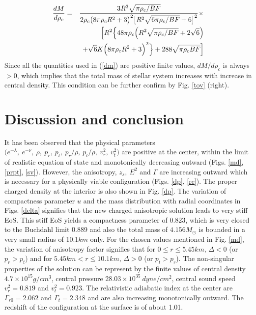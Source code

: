 \documentclass[preprintnumbers,amsmath,amssymb,floatfix,9pt,prd,twocolumn,
superscriptaddress,nofootinbib]{revtex4}
\begin{document}
\begin{eqnarray}
{d M \over d \rho_c} &=& \frac{3 R^3 \sqrt{\pi  \rho_c /B F} }{2 \rho_c \big(8 \pi  \rho_c R^2+3\big)^2 \big[R^2 \sqrt{6 \pi  \rho_c/B F}+6\big]^2}\times \nonumber\\
&&\Big[R^2 \Big\{48 \pi  \rho_c \Big(R^2 \sqrt{\pi \rho_c/B F}+2 \sqrt{6}\Big)\nonumber\\
&&+\sqrt{6} K \Big(8 \pi  \rho_c R^2+3\Big)^2\Big\}+288 \sqrt{\pi  \rho_c B F}\Big] \label{dm}
\end{eqnarray}
Since all the quantities used in (\ref{dm}) are positive finite values, $dM/d\rho_c$ is always $>0$, which implies that the total mass of stellar system increases with increase in central density. This condition can be further confirm by Fig. \ref{tov} (right).



\section{Discussion and conclusion}

It has been observed that the physical parameters $\big(e^{-\lambda},~e^{-\nu},~\rho,~p_r,~p_t,~p_r/\rho,~p_t/\rho,~v_r^2,~v_t^2 \big)$ are positive at the center, within the limit of realistic equation of state and monotonically decreasing outward (Figs. \ref{md}, \ref{prpt}, \ref{sv}). However, the anisotropy, $z_s,~E^2$ and $\Gamma$ are increasing outward which is necessary for a physically viable configuration (Figs. \ref{dp}, \ref{re}). The proper charged density at the interior is also shown in Fig. \ref{dp}. The variation of compactness parameter $u$ and the mass distribution with radial coordinates in Figs. \ref{delta} signifies that the new charged anisotropic  solution leads to very stiff EoS. This stiff EoS yields a compactness parameter of 0.823, which is very closed to the Buchdahl limit 0.889 and also the total mass of  $4.156M_\odot$ is bounded in a very small radius of 10.1$km$ only. For the chosen values mentioned in Fig. \ref{md}, the variation of anisotropy factor signifies that for $0\le r \le 5.45km$, $\Delta < 0$ (or $p_r>p_t$) and for $5.45km<r\le 10.1km$,  $\Delta > 0$ (or $p_t>p_r$). The non-singular properties of the solution can be represent by the finite values of central density $4.7\times 10^{15}g/cm^3$, central pressure $28.03\times 10^{35}~dyne/cm^2$, central sound speed $v_r^2=0.819$ and $v_t^2=0.923$. The relativistic adiabatic index at the center are $\Gamma_{r0}=2.062$ and $\Gamma_t=2.348$ and are also increasing monotonically outward. The redshift of the configuration at the surface is of about 1.01.\\
\end{document}
